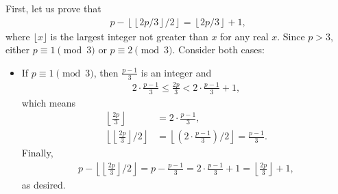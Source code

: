 \documentclass{subfile}
\begin{document}
	\begin{solution}
		First, let us prove that
		\begin{align}\label{eq:primefloor}
		p - \left\lfloor \left\lfloor 2p/3\right\rfloor /2\right\rfloor = \left\lfloor 2p/3\right\rfloor + 1,
		\end{align}
		where $\lfloor x \rfloor$ is the largest integer not greater than $x$ for any real $x$. Since $p>3$, either $p \equiv 1 \pmod 3$ or $p \equiv 2 \pmod 3$. Consider both cases:
		\begin{itemize}
			\item If $p \equiv 1 \pmod 3$, then $\frac{p-1}{3}$ is an integer and
			\begin{align*}
			2\cdot\frac {p - 1}{3}\leq\frac {2p}{3} < 2\cdot\frac {p - 1}{3} + 1,
			\end{align*}
			which means
			\begin{align*}
			\left\lfloor\frac {2p}{3}\right\rfloor &= 2\cdot\frac {p - 1}{3},\\
			\left\lfloor\left\lfloor\frac {2p}{3}\right\rfloor /2\right\rfloor &= \left\lfloor\left(2\cdot\frac {p - 1}{3}\right)/2\right\rfloor = \frac {p - 1}{3}.
			\end{align*}
			Finally,
			\begin{align*}
			p - \left\lfloor\left\lfloor\frac {2p}{3}\right\rfloor /2\right\rfloor = p - \frac {p - 1}{3} = 2\cdot\frac {p - 1}{3} + 1 = \left\lfloor\frac {2p}{3}\right\rfloor + 1,
			\end{align*}
			as desired.


\end{itemize}
\end{solution}
\end{document}
